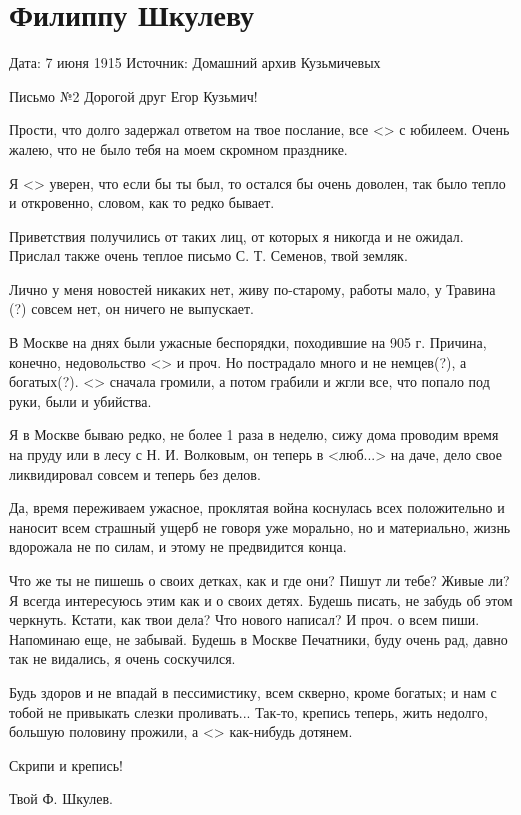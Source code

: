 \documentclass[]{memoir}
\begin{document}
\section{Филиппу Шкулеву}
                                            
Дата: 7 июня 1915
Источник: Домашний архив Кузьмичевых

Письмо №2
Дорогой друг
Егор Кузьмич!

Прости, что долго задержал ответом на твое послание, все <> с юбилеем.
Очень жалею, что не было тебя на моем скромном празднике.

Я <> уверен, что если бы ты был, то остался бы очень доволен, так было тепло и откровенно, словом, как то редко бывает.

Приветствия получились от таких лиц, от которых я никогда и не ожидал. Прислал также очень теплое письмо С. Т. Семенов, твой земляк.

Лично у меня новостей никаких нет, живу по-старому, работы мало,  у Травина (?) совсем нет, он ничего не выпускает.

В Москве на днях были ужасные беспорядки, походившие на 905 г. Причина, конечно, недовольство <> и проч. Но пострадало много и не немцев(?), а богатых(?). <> сначала громили, а потом грабили и жгли все, что попало под руки, были и убийства.

Я в Москве бываю редко, не более 1 раза в неделю, сижу дома проводим время на пруду или в лесу с Н. И. Волковым, он теперь в <люб...> на даче, дело свое ликвидировал совсем и теперь без делов.

Да, время переживаем ужасное, проклятая война коснулась всех положительно и наносит всем страшный ущерб не говоря уже морально, но и материально, жизнь вдорожала не по силам, и этому не предвидится конца.

Что же ты не пишешь о своих детках, как и где они? Пишут ли тебе? Живые ли? Я всегда интересуюсь этим как и о своих детях. Будешь писать, не забудь об этом черкнуть. Кстати, как твои дела? Что нового написал? И проч. о всем пиши. Напоминаю еще, не забывай. Будешь в Москве Печатники, буду очень рад, давно так не видались, я очень соскучился.

Будь здоров и не впадай в пессимистику, всем скверно, кроме богатых; и нам с тобой не привыкать слезки проливать... Так-то, крепись теперь, жить недолго, большую половину прожили, а <> как-нибудь дотянем.

Скрипи и крепись!

Твой Ф. Шкулев.
\end{document}
